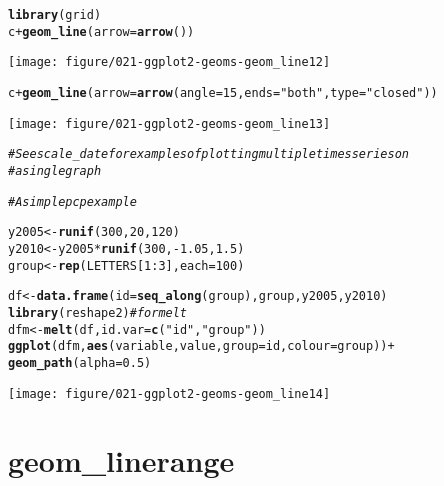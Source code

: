 \documentclass[a4paper,titlepage]{tufte-handout}\usepackage[]{graphicx}\usepackage[]{color}
\makeatletter
\def\maxwidth{ %
  \ifdim\Gin@nat@width>\linewidth
    \linewidth
  \else
    \Gin@nat@width
  \fi
}
\newcommand{\hlnum}[1]{\textcolor[rgb]{0.686,0.059,0.569}{#1}}%
\newcommand{\hlstr}[1]{\textcolor[rgb]{0.192,0.494,0.8}{#1}}%
\newcommand{\hlcom}[1]{\textcolor[rgb]{0.678,0.584,0.686}{\textit{#1}}}%
\newcommand{\hlopt}[1]{\textcolor[rgb]{0,0,0}{#1}}%
\newcommand{\hlstd}[1]{\textcolor[rgb]{0.345,0.345,0.345}{#1}}%
\newcommand{\hlkwb}[1]{\textcolor[rgb]{0.69,0.353,0.396}{#1}}%
\newcommand{\hlkwc}[1]{\textcolor[rgb]{0.333,0.667,0.333}{#1}}%
\newcommand{\hlkwd}[1]{\textcolor[rgb]{0.737,0.353,0.396}{\textbf{#1}}}%
\newenvironment{kframe}{%
 \def\at@end@of@kframe{}%
 \ifinner\ifhmode%
  \def\at@end@of@kframe{\end{minipage}}%
  \begin{minipage}{\columnwidth}%
 \fi\fi%
 \def\FrameCommand##1{\hskip\@totalleftmargin \hskip-\fboxsep
 \colorbox{shadecolor}{##1}\hskip-\fboxsep
     \hskip-\linewidth \hskip-\@totalleftmargin \hskip\columnwidth}%
 \MakeFramed {\advance\hsize-\width
   \@totalleftmargin\z@ \linewidth\hsize
   \@setminipage}}%
 {\par\unskip\endMakeFramed%
 \at@end@of@kframe}
\newenvironment{knitrout}{}{} %
\makeatother
\begin{document}
\begin{knitrout}
\begin{kframe}
\begin{alltt}
\hlkwd{library}\hlstd{(grid)}
\hlstd{c} \hlopt{+} \hlkwd{geom_line}\hlstd{(}\hlkwc{arrow} \hlstd{=} \hlkwd{arrow}\hlstd{())}
\end{alltt}
\end{kframe}
\texttt{[image: figure/021-ggplot2-geoms-geom\_line12]} 
\begin{kframe}\begin{alltt}
\hlstd{c} \hlopt{+} \hlkwd{geom_line}\hlstd{(}\hlkwc{arrow} \hlstd{=} \hlkwd{arrow}\hlstd{(}\hlkwc{angle} \hlstd{=} \hlnum{15}\hlstd{,} \hlkwc{ends} \hlstd{=} \hlstr{"both"}\hlstd{,} \hlkwc{type} \hlstd{=} \hlstr{"closed"}\hlstd{))}
\end{alltt}
\end{kframe}
\texttt{[image: figure/021-ggplot2-geoms-geom\_line13]} 
\begin{kframe}\begin{alltt}
\hlcom{# See scale_date for examples of plotting multiple times series on}
\hlcom{# a single graph}

\hlcom{# A simple pcp example}

\hlstd{y2005} \hlkwb{<-} \hlkwd{runif}\hlstd{(}\hlnum{300}\hlstd{,} \hlnum{20}\hlstd{,} \hlnum{120}\hlstd{)}
\hlstd{y2010} \hlkwb{<-} \hlstd{y2005} \hlopt{*} \hlkwd{runif}\hlstd{(}\hlnum{300}\hlstd{,} \hlopt{-}\hlnum{1.05}\hlstd{,} \hlnum{1.5}\hlstd{)}
\hlstd{group} \hlkwb{<-} \hlkwd{rep}\hlstd{(LETTERS[}\hlnum{1}\hlopt{:}\hlnum{3}\hlstd{],} \hlkwc{each} \hlstd{=} \hlnum{100}\hlstd{)}

\hlstd{df} \hlkwb{<-} \hlkwd{data.frame}\hlstd{(}\hlkwc{id} \hlstd{=} \hlkwd{seq_along}\hlstd{(group), group, y2005, y2010)}
\hlkwd{library}\hlstd{(reshape2)} \hlcom{# for melt}
\hlstd{dfm} \hlkwb{<-} \hlkwd{melt}\hlstd{(df,} \hlkwc{id.var} \hlstd{=} \hlkwd{c}\hlstd{(}\hlstr{"id"}\hlstd{,} \hlstr{"group"}\hlstd{))}
\hlkwd{ggplot}\hlstd{(dfm,} \hlkwd{aes}\hlstd{(variable, value,} \hlkwc{group} \hlstd{= id,} \hlkwc{colour} \hlstd{= group))} \hlopt{+}
  \hlkwd{geom_path}\hlstd{(}\hlkwc{alpha} \hlstd{=} \hlnum{0.5}\hlstd{)}
\end{alltt}
\end{kframe}
\texttt{[image: figure/021-ggplot2-geoms-geom\_line14]} 

\end{knitrout}


\section{geom\_linerange}
\end{document}
